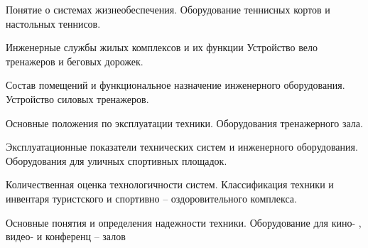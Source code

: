 \documentclass[
	14pt,
	a4paper,
	]
	{scrartcl}
\begin{document}
\shapk
{}
\setcounter{zad}{0}

\vfill
\z Понятие о системах жизнеобеспечения.
 \vfill
\z Оборудование теннисных кортов и настольных теннисов. \vfill

\vfill

\newpage


\shapk
{}
\setcounter{zad}{0}

\vfill
\z Инженерные службы жилых комплексов и их функции
 \vfill
\z Устройство вело тренажеров и беговых дорожек.
 \vfill

\vfill

\newpage


\shapk
{}
\setcounter{zad}{0}

\vfill
\z Состав помещений и функциональное назначение инженерного оборудования.
 \vfill
\z Устройство силовых тренажеров.
 \vfill

\vfill

\newpage


\shapk
{}
\setcounter{zad}{0}

\vfill
\z Основные положения по эксплуатации техники.
 \vfill
\z Оборудования тренажерного зала.
 \vfill

\vfill

\newpage


\shapk
{}
\setcounter{zad}{0}

\vfill
\z Эксплуатационные показатели технических систем и инженерного оборудования.
 \vfill
\z Оборудования для уличных спортивных площадок.
 \vfill

\vfill

\newpage


\shapk
{}
\setcounter{zad}{0}

\vfill
\z Количественная оценка технологичности систем.
 \vfill
\z Классификация техники и инвентаря туристского и спортивно – оздоровительного комплекса.
 \vfill

\vfill

\newpage


\shapk
{}
\setcounter{zad}{0}

\vfill
\z Основные понятия и определения надежности техники.
 \vfill
\z Оборудование для кино- , видео- и конференц – залов
 \vfill

\vfill

\newpage


\shapk
{}
\setcounter{zad}{0}
\end{document}
